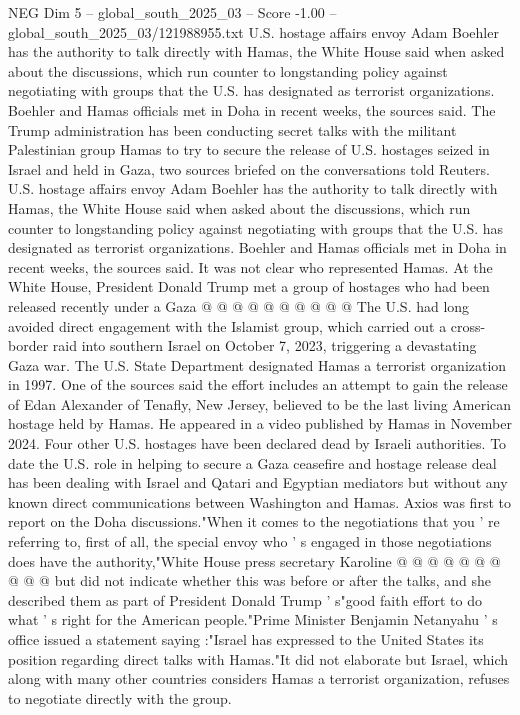 \begin{textsample}{NEG Dim 5 – global\_south\_2025\_03 – Score -1.00 – global\_south\_2025\_03/121988955.txt}  \label{ex:f5_neg_261}
U.S. hostage affairs envoy Adam Boehler has the authority to talk directly with Hamas, the White House said when asked about the discussions, which run counter to longstanding policy against negotiating with groups that the U.S. has designated as terrorist organizations.
Boehler and Hamas officials met in Doha in recent weeks, the sources said.
The Trump administration has been conducting secret talks with the militant Palestinian group Hamas to try to secure the release of U.S. hostages seized in Israel and held in Gaza, two sources briefed on the conversations told Reuters.
U.S. hostage affairs envoy Adam Boehler has the authority to talk directly with Hamas, the White House said when asked about the discussions, which run counter to longstanding policy against negotiating with groups that the U.S. has designated as terrorist organizations.
Boehler and Hamas officials met in Doha in recent weeks, the sources said.
It was not clear who represented Hamas.
At the White House, President Donald Trump met a group of hostages who had been released recently under a Gaza @ @ @ @ @ @ @ @ @ @ The U.S. had long avoided direct engagement with the Islamist group, which carried out a cross-border raid into southern Israel on October 7, 2023, triggering a devastating Gaza war.
The U.S.
State Department designated Hamas a terrorist organization in 1997.
One of the sources said the effort includes an attempt to gain the release of Edan Alexander of Tenafly, New Jersey, believed to be the last living American hostage held by Hamas.
He appeared in a video published by Hamas in November 2024.
Four other U.S. hostages have been declared dead by Israeli authorities.
To date the U.S. role in helping to secure a Gaza ceasefire and hostage release deal has been dealing with Israel and Qatari and Egyptian mediators but without any known direct communications between Washington and Hamas.
Axios was first to report on the Doha discussions."When it comes to the negotiations that you ' re referring to, first of all, the special envoy who ' s engaged in those negotiations does have the authority,"White House press secretary Karoline @ @ @ @ @ @ @ @ @ @ but did not indicate whether this was before or after the talks, and she described them as part of President Donald Trump ' s"good faith effort to do what ' s right for the American people."Prime Minister Benjamin Netanyahu ' s office issued a statement saying :"Israel has expressed to the United States its position regarding direct talks with Hamas."It did not elaborate but Israel, which along with many other countries considers Hamas a terrorist organization, refuses to negotiate directly with the group.

\end{textsample}
